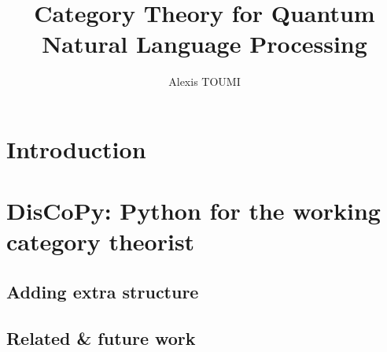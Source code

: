

\title{Category Theory for Quantum\\
Natural Language Processing}
\author{Alexis TOUMI}

\degreedate{\today}




\begin{romanpages}
\maketitle



\tableofcontents

\end{romanpages}

\chapter*{Introduction}






\chapter{DisCoPy: Python for the working category theorist}







\section{Adding extra structure} \label{section:extra structure}

\section{Related \& future work} \label{section:related and future}

